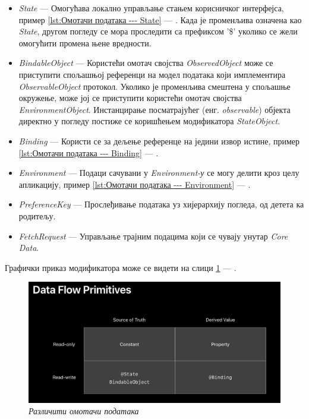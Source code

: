\documentclass[12pt,oneside]{memoir}
\begin{document}
\begin{itemize}
    \item \textit{State} --- Омогућава локално управљање стањем корисничког интерфејса, пример \ref{lst:Омотачи података --- State} --- . Када је променљива означена као \textit{State}, другом погледу се мора проследити са префиксом '\$' уколико се жели омогућити промена њене вредности.
    \item \textit{BindableObject} --- Користећи омотач својства \textit{ObservedObject}  може се приступити спољашњој референци на модел података који имплементира \textit{ObservableObject} протокол. Уколико је променљива смештена у спољашње окружење, може јој се приступити користећи омотач својства \textit{EnvironmentObject}. Инстанцирање посматрајућег (енг. \textit{observable}) објекта директно у погледу постиже се коришћењем модификатора \textit{StateObject}.
    \item \textit{Binding} --- Користи се за дељење референце на једини извор истине, пример \ref{lst:Омотачи података --- Binding} --- .
    \item \textit{Environment} --- Подаци сачувани у \textit{Environment-у} се могу делити кроз целу апликацију, пример \ref{lst:Омотачи података --- Environment} --- .
    \item \textit{PreferenceKey} --- Прослеђивање података уз хијерархију погледа, од детета ка родитељу.
    \item \textit{FetchRequest} --- Управљање трајним подацима који се чувају унутар \textit{Core Data}.
\end{itemize}

Графички приказ модификатора може се видети на слици \ref{slika:data_flow_primitives} --- .

\begin{figure}[H]
\includegraphics[width=1\textwidth]{images/DataFlowPrimitives.png}
\centering
\caption{\textit{Различити омотачи података}}
\label{slika:data_flow_primitives}
\end{figure}
\end{document}
